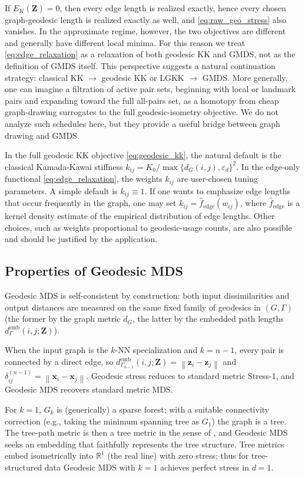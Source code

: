 \documentclass[11pt]{article}
\newcommand{\R}{\mathbb{R}}
\newcommand{\bx}{\mathbf{x}}
\newcommand{\bz}{\mathbf{z}}
\newcommand{\bZ}{\mathbf{Z}}
\newcommand{\norm}[1]{\left\|#1\right\|}
\newcommand{\demb}{d^{\mathrm{emb}}}
\newcommand{\Gk}{G_k}
\begin{document}
If $E_K(\bZ) = 0$, then every edge length is realized exactly, hence every
chosen graph-geodesic length is realized exactly as well, and
\cref{eq:raw_geo_stress} also vanishes.  In the approximate regime, however,
the two objectives are different and generally have different local minima.
For this reason we treat \cref{eq:edge_relaxation} as a relaxation of both
geodesic KK and GMDS, not as the definition of GMDS itself.  This
perspective suggests a natural continuation strategy:
classical KK $\to$ geodesic KK or LGKK $\to$ GMDS.  More generally, one can
imagine a filtration of active pair sets, beginning with local or landmark
pairs and expanding toward the full all-pairs set, as a homotopy from
cheap graph-drawing surrogates to the full geodesic-isometry objective.
We do not analyze such schedules here, but they provide a useful bridge
between graph drawing and GMDS.

In the full geodesic KK objective \cref{eq:geodesic_kk}, the natural
default is the classical Kamada-Kawai stiffness
$k_{ij} = K_0/\max\{d_G(i,j), \varepsilon_d\}^2$.  In the edge-only
functional \cref{eq:edge_relaxation}, the weights $k_{ij}$ are
user-chosen tuning parameters.  A simple default is $k_{ij} \equiv 1$.
If one wants to emphasize edge lengths that occur frequently in the graph,
one may set $k_{ij} = \hat f_{\mathrm{edge}}(w_{ij})$, where
$\hat f_{\mathrm{edge}}$ is a kernel density estimate of the empirical
distribution of edge lengths.  Other choices, such as weights proportional to
geodesic-usage counts, are also possible and should be justified by the
application.

\subsection{Properties of Geodesic MDS}
\label{sec:properties}

Geodesic MDS is self-consistent by construction:
both input dissimilarities and output distances are measured on the same
fixed family of geodesics in $(G,\Gamma)$ (the former by the graph
metric $d_G$, the latter by the embedded path lengths
$\demb_{\Gamma}(i,j;\bZ)$).

When the input graph is the $k$-NN specialization and $k = n-1$, every
pair is connected by a direct edge, so
$\demb_{\Gamma_{n-1}}(i,j;\bZ) = \norm{\bz_i - \bz_j}$ and
$\delta^{(n-1)}_{ij} = \norm{\bx_i - \bx_j}$.  Geodesic stress reduces to
standard metric Stress-1, and Geodesic MDS recovers standard metric MDS.

For $k = 1$, $\Gk$ is (generically) a sparse forest; with a suitable
connectivity correction (e.g., taking the minimum spanning tree as
$G_1$) the graph is a tree.  The tree-path metric is then a tree metric in
the sense of \citet{dress1984trees}, and Geodesic MDS seeks an
embedding that faithfully represents the tree structure.  Tree metrics
embed isometrically into $\R^1$ (the real line) with zero stress;
thus for tree-structured data Geodesic MDS with $k=1$ achieves
perfect stress in $d=1$.
\end{document}
